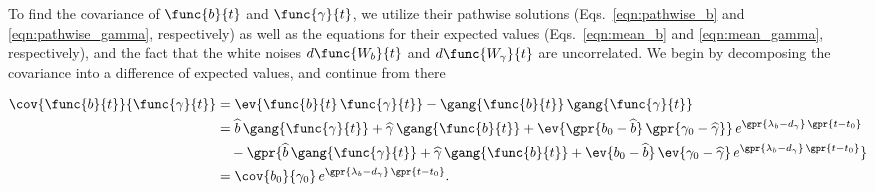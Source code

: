 To find the covariance of $\func{b}{t}$ and $\func{\gamma}{t}$, we utilize their pathwise solutions (Eqs.~\ref{eqn:pathwise_b} and \ref{eqn:pathwise_gamma}, respectively) as well as the equations for their expected values (Eqs.~\ref{eqn:mean_b} and \ref{eqn:mean_gamma}, respectively), and the fact that the white noises $d\func{W_b}{t}$ and $d\func{W_{\gamma}}{t}$ are uncorrelated. We begin by decomposing the covariance into a difference of expected values, and continue from there

\begin{align}
	\cov{\func{b}{t}}{\func{\gamma}{t}} &= \ev{\func{b}{t}\,\func{\gamma}{t}} - \gang{\func{b}{t}}\,\gang{\func{\gamma}{t}} \nonumber \\
		&= \widehat{b}\,\gang{\func{\gamma}{t}} + \widehat{\gamma}\,\gang{\func{b}{t}} + \ev{\gpr{b_0 - \widehat{b}}\,\gpr{\gamma_0 - \widehat{\gamma}}}\,e^{\gpr{\lambda_b - d_{\gamma}}\,\gpr{t - t_0}} \nonumber \\
			&\quad - \gpr{\widehat{b}\,\gang{\func{\gamma}{t}} + \widehat{\gamma}\,\gang{\func{b}{t}} + \ev{b_0 - \widehat{b}}\,\ev{\gamma_0 - \widehat{\gamma}}\,e^{\gpr{\lambda_b - d_{\gamma}}\,\gpr{t - t_0}}} \nonumber \\
		&= \cov{b_0}{\gamma_0}\,e^{\gpr{\lambda_b - d_{\gamma}}\,\gpr{t - t_0}}. \label{eqn:cov_b_gamma}
\end{align}
	